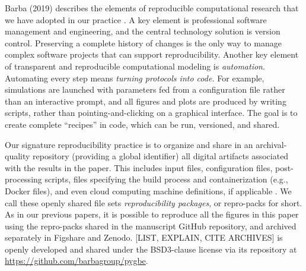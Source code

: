  Barba (2019) describes the elements of reproducible computational research that we have adopted in our practice \cite{barba2019praxis}. 
 A key element is professional software management and engineering, and the central technology solution is version control. 
 Preserving a complete history of changes is the only way to manage complex software projects that can support reproducibility.
 Another key element of transparent and reproducible computational modeling is \emph{automation}.
Automating every step means \emph{turning protocols into code.}
For example, simulations are launched with parameters fed from a configuration file rather than an interactive prompt, and all figures and plots are produced by writing scripts, rather than pointing-and-clicking on a graphical interface. 
The goal is to create complete ``recipes'' in code, which can be run, versioned, and shared. 

Our signature reproducibility practice is to organize and share in an archival-quality repository (providing a global identifier) all digital artifacts associated with the results in the paper. 
This includes input files, configuration files, post-processing scripts, files specifying the build process and containerization (e.g., Docker files), and even cloud computing machine definitions, if applicable \cite{mesnard-barba2019}.
We call these openly shared file sets \emph{reproducibility packages}, or repro-packs for short.
As in our previous papers, it is possible to reproduce all the figures in this paper using the repro-packs shared in the manuscript GitHub repository, and archived separately in Figshare and Zenodo.
[LIST, EXPLAIN, CITE ARCHIVES] 
\pygbe is openly developed and shared under the BSD3-clause license via its repository at \url{https://github.com/barbagroup/pygbe}.

